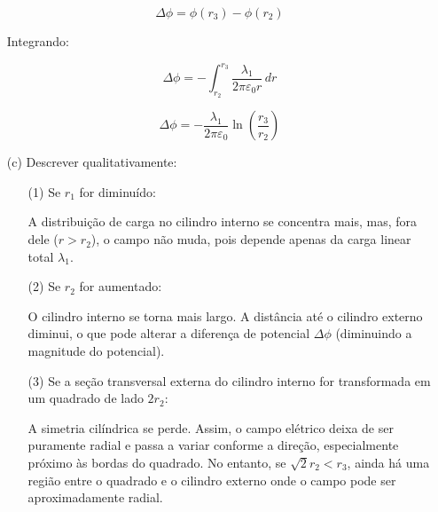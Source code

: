 \documentclass[a4paper,12pt]{article}
\begin{document}
\begin{flushleft}
\begin{itemize}
    \begin{equation}
    \Delta \phi = \phi(r_3) - \phi(r_2)
    \end{equation}

    Integrando:

    \begin{equation}
    \Delta \phi = -\int_{r_2}^{r_3} \frac{\lambda_1}{2\pi\varepsilon_0 r} \, dr
    \end{equation}

    \begin{equation}
    \Delta \phi = -\frac{\lambda_1}{2\pi\varepsilon_0} \ln\left(\frac{r_3}{r_2}\right)
    \end{equation}

    \item[(c)] Descrever qualitativamente:

    \begin{itemize}
        \item[(1)] Se $r_1$ for diminuído:

        A distribuição de carga no cilindro interno se concentra mais, mas, fora dele ($r > r_2$), o campo não muda, pois depende apenas da carga linear total $\lambda_1$.

        \item[(2)] Se $r_2$ for aumentado:

        O cilindro interno se torna mais largo. A distância até o cilindro externo diminui, o que pode alterar a diferença de potencial $\Delta \phi$ (diminuindo a magnitude do potencial).

        \item[(3)] Se a seção transversal externa do cilindro interno for transformada em um quadrado de lado $2r_2$:

        A simetria cilíndrica se perde. Assim, o campo elétrico deixa de ser puramente radial e passa a variar conforme a direção, especialmente próximo às bordas do quadrado. No entanto, se $\sqrt{2} r_2 < r_3$, ainda há uma região entre o quadrado e o cilindro externo onde o campo pode ser aproximadamente radial.
    \end{itemize}

\end{itemize}

\end{flushleft}
\end{document}
